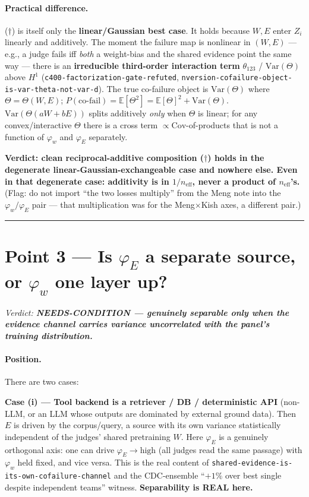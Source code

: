 \documentclass[11pt,a4paper]{article}
\begin{document}
\paragraph{Practical difference.}
($\dagger$) is itself only the \textbf{linear/Gaussian best case}.
It holds because $W,E$ enter $Z_i$ linearly and additively.
The moment the failure map is nonlinear in $(W,E)$ --- e.g., a judge fails iff \emph{both} a
weight-bias and the shared evidence point the same way --- there is an \textbf{irreducible
third-order interaction term} $\theta_{123}$ / $\mathrm{Var}(\Theta)$ above $H^1$
(\texttt{c400-factorization-gate-refuted}, \texttt{nversion-cofailure-object-is-var-theta-not-var-d}).
The true co-failure object is $\mathrm{Var}(\Theta)$ where $\Theta = \Theta(W,E)$;
$P(\text{co-fail}) = \mathbb{E}[\Theta^2] = \mathbb{E}[\Theta]^2 + \mathrm{Var}(\Theta)$.
$\mathrm{Var}(\Theta(aW+bE))$ splits additively \emph{only} when $\Theta$ is linear;
for any convex/interactive $\Theta$ there is a cross term $\propto \mathrm{Cov}$-of-products that
is not a function of $\varphi_w$ and $\varphi_E$ separately.

\textbf{Verdict: clean reciprocal-additive composition ($\dagger$) holds in the degenerate
linear-Gaussian-exchangeable case and nowhere else. Even in that degenerate case: additivity
is in $1/n_{\mathrm{eff}}$, never a product of $n_{\mathrm{eff}}$'s.}
(Flag: do not import ``the two losses multiply'' from the Meng note into the
$\varphi_w/\varphi_E$ pair --- that multiplication was for the Meng$\times$Kish axes, a
different pair.)

\bigskip
\hrule
\bigskip

\section*{Point 3 --- Is $\varphi_E$ a separate source, or $\varphi_w$ one layer up?}
\label{sec:point3}

\noindent\textit{Verdict: \textbf{NEEDS-CONDITION --- genuinely separable only when the evidence channel
carries variance uncorrelated with the panel's training distribution.}}

\medskip

\paragraph{Position.}
There are two cases:

\textbf{Case (i) --- Tool backend is a retriever / DB / deterministic API} (non-LLM, or an LLM
whose outputs are dominated by external ground data).
Then $E$ is driven by the corpus/query, a source with its own variance statistically independent
of the judges' shared pretraining $W$.
Here $\varphi_E$ is a genuinely orthogonal axis: one can drive $\varphi_E \to \text{high}$
(all judges read the same passage) with $\varphi_w$ held fixed, and vice versa.
This is the real content of \texttt{shared-evidence-is-its-own-cofailure-channel} and the
CDC-ensemble ``$+1\%$ over best single despite independent teams'' witness.
\textbf{Separability is REAL here.}
\end{document}
